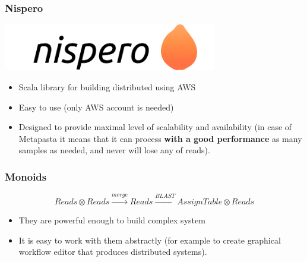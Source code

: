 \documentclass{beamer}
\begin{document}
\begin{frame}
\frametitle{Nispero}
\includegraphics[width=0.7\textwidth]{nispero.png}
\begin{itemize}
  \item Scala library for building distributed using AWS
  \item Easy to use (only AWS account is needed)
  \item Designed to provide maximal level of scalability and availability 
  (in case of Metapasta it means that it can process {\bf with a good performance} as many samples as needed, and never will lose any of reads).
\end{itemize}
\end{frame}



\begin{frame}
\frametitle{Monoids}
$$ Reads \otimes Reads \xrightarrow{merge} Reads \xrightarrow{BLAST} AssignTable \otimes Reads $$

\begin{itemize}
  \item They are powerful enough to build complex system
  \item It is easy to work with them abstractly (for example to create graphical workflow editor that produces distributed systems).
\end{itemize}

\end{frame}


\end{document}
